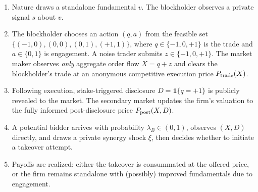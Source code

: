 \documentclass[11pt]{article}
\newcommand{\1}{\mathbf{1}}
\begin{document}
\begin{enumerate}[leftmargin=2em]
\item[$t=0$:] Nature draws a standalone fundamental $v$. The blockholder observes a private signal $s$ about $v$.
\item[$t=1$:] The blockholder chooses an action $(q,a)$ from the feasible set $\{(-1,0),(0,0),(0,1),(+1,1)\}$, where $q \in \{-1,0,+1\}$ is the trade and $a \in \{0,1\}$ is engagement. A noise trader submits $z \in \{-1, 0, +1\}$. The market maker observes \emph{only} aggregate order flow $X = q + z$ and clears the blockholder's trade at an anonymous competitive execution price $P_{\textup{trade}}(X)$.
\item[$t=1.2$:] Following execution, stake-triggered disclosure $D=\1\{q=+1\}$ is publicly revealed to the market. The secondary market updates the firm's valuation to the fully informed post-disclosure price $P_{\textup{post}}(X,D)$.
\item[$t=1.5$:] A potential bidder arrives with probability $\lambda_B \in (0,1)$, observes $(X,D)$ directly, and draws a private synergy shock $\xi$, then decides whether to initiate a takeover attempt.
\item[$t=2$:] Payoffs are realized: either the takeover is consummated at the offered price, or the firm remains standalone with (possibly) improved fundamentals due to engagement.
\end{enumerate}
\end{document}
